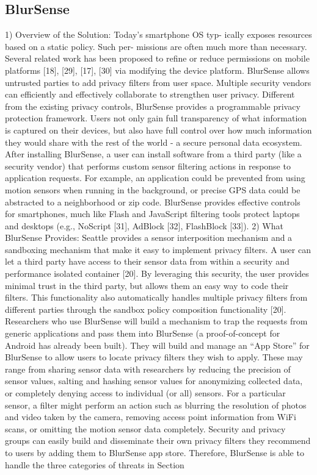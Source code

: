 \subsection{BlurSense}
1) Overview of the Solution: Today's smartphone OS typ-
ically exposes resources based on a static policy. Such per-
missions are often much more than necessary. Several related
work has been proposed to refine or reduce permissions on
mobile platforms [18], [29], [17], [30] via modifying the
device platform. BlurSense allows untrusted parties to add
privacy filters from user space. Multiple security vendors
can efficiently and effectively collaborate to strengthen user
privacy.
Different from the existing privacy controls, BlurSense
provides a programmable privacy protection framework. Users
not only gain full transparency of what information is captured
on their devices, but also have full control over how much
information they would share with the rest of the world -
a secure personal data ecosystem. After installing BlurSense,
a user can install software from a third party (like a security vendor) that performs custom sensor filtering actions in
response to application requests. For example, an application
could be prevented from using motion sensors when running
in the background, or precise GPS data could be abstracted
to a neighborhood or zip code. BlurSense provides effective
controls for smartphones, much like Flash and JavaScript
filtering tools protect laptops and desktops (e.g., NoScript [31],
AdBlock [32], FlashBlock [33]).
2) What BlurSense Provides: Seattle provides a sensor
interposition mechanism and a sandboxing mechanism that
make it easy to implement privacy filters. A user can let a third
party have access to their sensor data from within a security
and performance isolated container [20]. By leveraging this
security, the user provides minimal trust in the third party,
but allows them an easy way to code their filters. This
functionality also automatically handles multiple privacy filters
from different parties through the sandbox policy composition
functionality [20].
Researchers who use BlurSense will build a mechanism
to trap the requests from generic  applications and pass them
into BlurSense (a proof-of-concept for Android has already
been built). They will build and manage an ``App Store'' for
BlurSense to allow users to locate privacy filters they wish
to apply. These may range from sharing sensor data with
researchers by reducing the precision of sensor values, salting
and hashing sensor values for anonymizing collected data,
or completely denying access to individual (or all) sensors.
For a particular sensor, a filter might perform an action such
as blurring the resolution of photos and video taken by the
camera, removing access point information from WiFi scans,
or omitting the motion sensor data completely. Security and
privacy groups can easily build and disseminate their own
privacy filters they recommend to users by adding them to
BlurSense app store. Therefore, BlurSense is able to handle
the three categories of threats in Section
